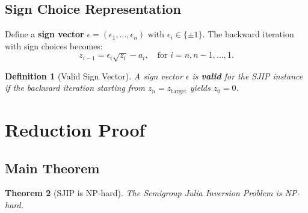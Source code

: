 \documentclass[11pt]{article}
\newtheorem{theorem}{Theorem}[section]
\newtheorem{definition}[theorem]{Definition}
\begin{document}
\subsection{Sign Choice Representation}
Define a \textbf{sign vector} $\epsilon = (\epsilon_1, \dots, \epsilon_n)$ with $\epsilon_i \in \{\pm 1\}$. The backward iteration with sign choices becomes:
\[
z_{i-1} = \epsilon_i \sqrt{z_i} - a_i, \quad \text{for } i = n, n-1, \dots, 1.
\]

\begin{definition}[Valid Sign Vector]
A sign vector $\epsilon$ is \textbf{valid} for the SJIP instance if the backward iteration starting from $z_n = z_{\text{target}}$ yields $z_0 = 0$.
\end{definition}

\section{Reduction Proof}

\subsection{Main Theorem}
\begin{theorem}[SJIP is NP-hard]
\label{thm:sjip-nphard}
The Semigroup Julia Inversion Problem is NP-hard.
\end{theorem}
\end{document}

